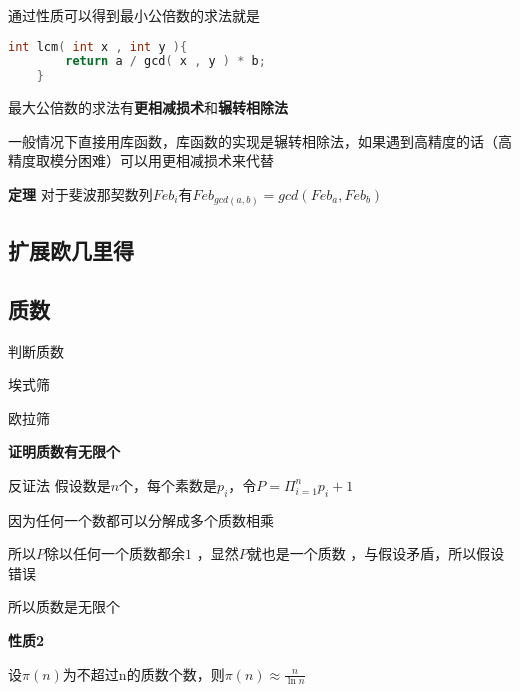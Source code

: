 通过性质可以得到最小公倍数的求法就是
\begin{lstlisting}[language = c]
    int lcm( int x , int y ){
        return a / gcd( x , y ) * b;
    }
\end{lstlisting}
最大公倍数的求法有\textbf{更相减损术}和\textbf{辗转相除法}



一般情况下直接用库函数，库函数的实现是辗转相除法，如果遇到高精度的话（高精度取模分困难）可以用更相减损术来代替

\textbf{定理} 对于斐波那契数列$Feb_i$有$Feb_{gcd(a,b)}=gcd(Feb_a , Feb_b)$

\subsection{扩展欧几里得}


\subsection{质数}
判断质数

埃式筛

欧拉筛


\textbf{证明质数有无限个}

反证法 假设数是$n$个，每个素数是$p_i$，令$P = \Pi_{i=1}^{n} p_i + 1$

因为任何一个数都可以分解成多个质数相乘

所以$P$除以任何一个质数都余$1$ ，显然$P$就也是一个质数 ，与假设矛盾，所以假设错误

所以质数是无限个

\textbf{性质2}

设$\pi(n)$为不超过n的质数个数，则$\pi(n) \approx \frac{n}{\ln{n}}$


